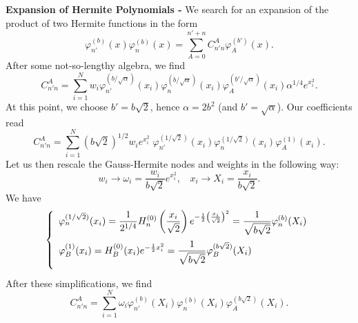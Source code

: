 {\bf Expansion of Hermite Polynomials - } We search for an expansion of the 
product of two Hermite functions in the form
\begin{equation}
\varphi^{(b)}_{n'}(x)\varphi^{(b)}_{n}(x) = \sum_{A=0}^{n'+n} C_{n'n}^{A} \varphi^{(b')}_{A}(x).
\label{eq:2Hermites}
\end{equation}
After some not-so-lengthy algebra, we find
\begin{equation}
C_{n'n}^{A} = 
\sum_{i=1}^{N} w_{i}
\varphi_{n'}^{(b/\sqrt{\alpha})}(x_{i}) 
\varphi_{n}^{(b/\sqrt{\alpha})} (x_{i}) 
\varphi_{A}^{(b'/\sqrt{\alpha})}(x_{i}) 
\alpha^{1/4}
e^{x_{i}^{2}}.
\end{equation}
At this point, we choose $b' = b\sqrt{2}$, hence $\alpha = 2b^{2}$ (and 
$b' = \sqrt{\alpha}$). Our coefficients read
\begin{equation}
C_{n'n}^{A} = 
\sum_{i=1}^{N} \left( b\sqrt{2} \right)^{1/2} w_{i} e^{x_{i}^{2}}\;
\varphi_{n'}^{(1/\sqrt{2})}(x_{i}) 
\varphi_{n}^{(1/\sqrt{2})} (x_{i}) 
\varphi_{A}^{(1)}(x_{i}) .
\end{equation}
Let us then rescale the Gauss-Hermite nodes and weights in the following way:
\begin{equation}
w_{i} \rightarrow \omega_{i} = \frac{w_{i}}{b\sqrt{2}}e^{x_{i}^{2}}, \ \ \ \ 
x_{i} \rightarrow X_{i} = \frac{x_{i}}{b\sqrt{2}}.
\end{equation}
We have
\begin{equation}
\left\{
\begin{array}{l}
\varphi_{n}^{(1/\sqrt{2})}(x_{i}) 
= \displaystyle 
\frac{1}{2^{1/4}} H_{n}^{(0)}\left(\frac{x_{i}}{\sqrt{2}}\right) e^{-\frac{1}{2}\left(\frac{x_{i}}{\sqrt{2}} \right)^{2}}
= \frac{1}{\sqrt{b\sqrt{2}}} \varphi_{n}^{(b)}(X_{i}) \medskip\\
\varphi_{B}^{(1)}(x_{i}) 
= \displaystyle 
H_{B}^{(0)}(x_{i}) e^{-\frac{1}{2}x_{i}^{2}}
= \frac{1}{\sqrt{b\sqrt{2}}} \varphi_{B}^{(b\sqrt{2})}(X_{i}) \medskip\\
\end{array}
\right.
\end{equation}
After these simplifications, we find
\begin{equation}
C_{n'n}^{A} = 
\sum_{i=1}^{N} \omega_{i}
\varphi_{n'}^{(b)}(X_{i}) 
\varphi_{n}^{(b)} (X_{i}) 
\varphi_{A}^{(b\sqrt{2})}(X_{i}).
\end{equation}

